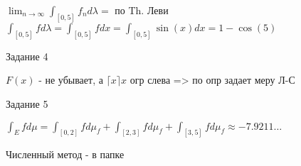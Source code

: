 \documentclass[a4paper,10pt]{article}
\begin{document}
    $\lim_{n \to \infty}{\int_{[0, 5]}{f_n d\lambda}} = $ по Th. Леви $\int_{[0, 5]}{f d\lambda} = \int_{[0, 5]}{f dx} = \int_{[0, 5]}{\sin(x) dx} = 1 - \cos(5)$
    \newline
    
    Задание 4
    \newline
    
    $F(x)$ - не убывает, а $\lceil x \rceil x$ огр слева => по опр задает меру Л-С
    \newline
    
    Задание 5
    \newline

    $\int_{E}{fd\mu} = \int_{[0, 2]}{fd\mu_f} + \int_{[2, 3]}{fd\mu_f} + \int_{[3, 5]}{fd\mu_f} \approx -7.9211\dots $
    \newline

    Численный метод - в папке
    \newline
\end{document}
